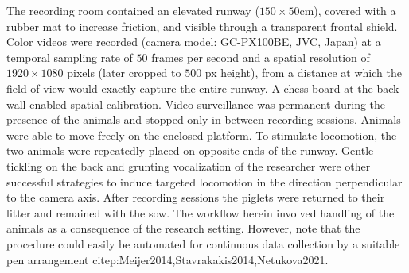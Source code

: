 \documentclass[10pt,a4paper]{article}
\begin{document}
The recording room contained an elevated runway (\(150 \times 50\)cm), covered with a rubber mat to increase friction, and visible through a transparent frontal shield.
Color videos were recorded (camera model: GC-PX100BE, JVC, Japan) at a temporal sampling rate of \(50\) frames per second and a spatial resolution of \(1920 \times 1080\) pixels (later cropped to \(500\) px height), from a distance at which the field of view would exactly capture the entire runway.
A chess board at the back wall enabled spatial calibration.
Video surveillance was permanent during the presence of the animals and stopped only in between recording sessions.
Animals were able to move freely on the enclosed platform.
To stimulate locomotion, the two animals were repeatedly placed on opposite ends of the runway.
Gentle tickling on the back and grunting vocalization of the researcher were other successful strategies to induce targeted locomotion in the direction perpendicular to the camera axis.
After recording sessions the piglets were returned to their litter and remained with the sow.
The workflow herein involved handling of the animals as a consequence of the research setting.
However, note that the procedure could easily be automated for continuous data collection by a suitable pen arrangement citep:Meijer2014,Stavrakakis2014,Netukova2021.
\end{document}
